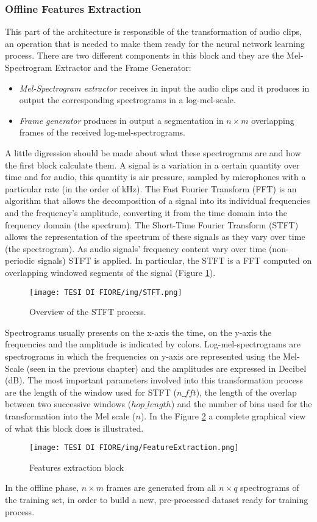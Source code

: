 \subsubsection{Offline Features Extraction}
This part of the architecture is responsible of the transformation of audio clips, an operation that is needed to make them ready for the neural network learning process. There are two different components in this block and they are the Mel-Spectrogram Extractor and the Frame Generator:
\begin{itemize}
    \item {\textit{Mel-Spectrogram extractor} receives in input the audio clips and it produces in output the corresponding spectrograms in a log-mel-scale.}
    \item {\textit{Frame generator} produces in output a segmentation in $n \times m$ overlapping frames of the received log-mel-spectrograms.  }
\end{itemize}
A little digression should be made about what these spectrograms are and how the first block calculate them. A signal is a variation in a certain quantity over time and for audio, this quantity is air pressure, sampled by microphones with a particular rate (in the order of kHz). The Fast Fourier Transform (FFT) is an algorithm that allows the decomposition of a signal into its individual frequencies and the frequency’s amplitude, converting it from the time domain into the frequency domain (the spectrum). The Short-Time Fourier Transform (STFT) allows the representation of the spectrum of these signals as they vary over time (the spectrogram). As audio signals' frequency content vary over time (non-periodic signals) STFT is applied. In particular, the STFT is a FFT computed on overlapping windowed segments of the signal (Figure \ref{sftf}).\\
\begin{figure}[ht]
\texttt{[image: TESI DI FIORE/img/STFT.png]}
\centering
\caption{Overview of the STFT process.}
\label{sftf}
\end{figure}
Spectrograms usually presents on the x-axis the time, on the y-axis the frequencies and the amplitude is indicated by colors. Log-mel-spectrograms are spectrograms in which the frequencies on y-axis are represented using the Mel-Scale (seen in the previous chapter) and the amplitudes are expressed in Decibel (dB). The most important parameters involved into this transformation process are the length of the window used for STFT ($n\_fft$), the length of the overlap between two successive windows ($hop\_length$) and the number of bins used for the transformation into the Mel scale ($n$).
In the Figure \ref{features-extraction} a complete graphical view of what this block does is illustrated.
\begin{figure}[ht]
\texttt{[image: TESI DI FIORE/img/FeatureExtraction.png]}
\centering
\caption{Features extraction block}
\label{features-extraction}
\end{figure}
In the offline phase, $n \times m$ frames are generated from all $n \times q$ spectrograms of the training set, in order to build a new, pre-processed dataset ready for training process.
